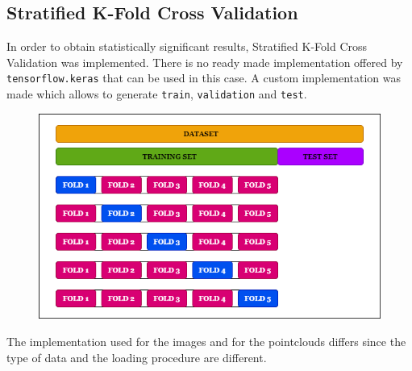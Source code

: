 \documentclass[11pt,a4paper]{article}
\begin{document}
\subsection{Stratified K-Fold Cross Validation}
In order to obtain statistically significant results, Stratified K-Fold Cross Validation was implemented. There is no ready made implementation offered by \texttt{tensorflow.keras} that can be used in this case. A custom implementation was made which allows to generate \texttt{train}, \texttt{validation} and \texttt{test}.
\begin{figure}[H]
    \centering
    \includegraphics[scale=0.5]{imgs/train-validation-test.png}
\end{figure}
\noindent
The implementation used for the images and for the pointclouds differs since the type of data and the loading procedure are different.
\end{document}
